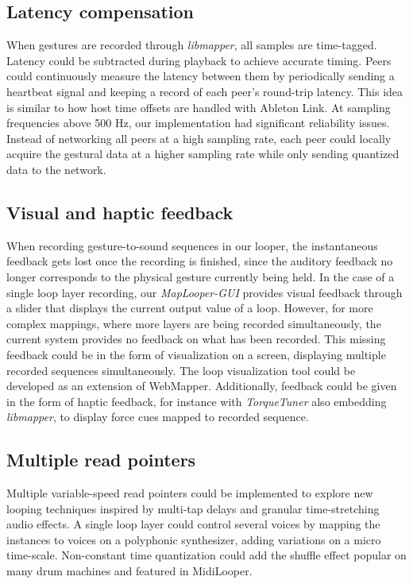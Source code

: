 \documentclass[sigconf]{nimeart}
\begin{document}
\subsection{Latency compensation}\label{latency-compensation}

When gestures are recorded through \emph{libmapper}, all samples are time-tagged. Latency could be subtracted during playback to achieve accurate timing. Peers could continuously measure the latency between them by periodically sending a heartbeat signal and keeping a record of each peer's round-trip latency. This idea is similar to how host time offsets are handled with Ableton Link. At sampling frequencies above 500 Hz, our implementation had significant reliability issues. Instead of networking all peers at a high sampling rate, each peer could locally acquire the gestural data at a higher sampling rate while only sending quantized data to the network.

\subsection{Visual and haptic feedback}\label{visual-and-haptic-feedback}

When recording gesture-to-sound sequences in our looper, the instantaneous feedback gets lost once the recording is finished, since the auditory feedback no longer corresponds to the physical gesture currently being held. In the case of a single loop layer recording, our \emph{MapLooper-GUI} provides visual feedback through a slider that displays the current output value of a loop. However, for more complex mappings, where more layers are being recorded simultaneously, the current system provides no feedback on what has been recorded. This missing feedback could be in the form of visualization on a screen, displaying multiple recorded sequences simultaneously. The loop visualization tool could be developed as an extension of WebMapper. Additionally, feedback could be given in the form of haptic feedback, for instance with \emph{TorqueTuner} \cite{c41} also embedding \emph{libmapper}, to display force cues mapped to recorded sequence.

\subsection{Multiple read pointers}\label{multiple-read-pointers}

Multiple variable-speed read pointers could be implemented to explore new looping techniques inspired by multi-tap delays and granular time-stretching audio effects. A single loop layer could control several voices by mapping the instances to voices on a polyphonic synthesizer, adding variations on a micro time-scale. Non-constant time quantization could add the shuffle effect popular on many drum machines and featured in MidiLooper.
\end{document}

